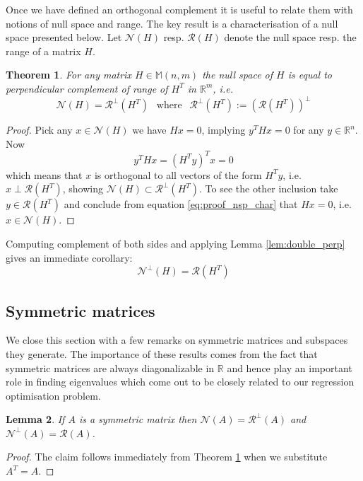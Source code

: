 \documentclass[a4paper,11pt]{article}
\theoremstyle{break}
\newtheorem{theorem}{Theorem}[section]
\newtheorem{lemma}[theorem]{Lemma}
\newcommand{\R}{\mathbb{R}}
\newcommand{\Nu}{\mathcal{N}}
\newcommand{\Ra}{\mathcal{R}}
\newcommand{\Mat}[2]{\mathbb{M}(#1, #2)}
\begin{document}
Once we have defined an orthogonal complement it is useful to relate them with notions of null space and range.
The key result is a characterisation of a null space presented below.
Let $\Nu(H)$ resp. $\Ra(H)$ denote the null space resp. the range of a matrix $H$.

\begin{theorem} \label{thm:charact_nullspace}
    For any matrix $H \in \Mat{n}{m}$ the null space of $H$ is equal to perpendicular complement of range of $H^T$ in $\R^m$, i.e.
    $$\Nu(H) = \Ra^\perp(H^T) ~~\text{ where }~~ \Ra^\perp(H^T) := (\Ra(H^T))^\perp$$
\end{theorem}

\begin{proof}
    Pick any $x \in \Nu(H)$ we have $H x = 0$, implying $ y^T H x = 0$ for any $y \in \R^n$. Now
    \begin{equation}\label{eq:proof_nsp_char}
        y^T H x = (H^T y )^T x = 0
    \end{equation}
    which means that $x$ is orthogonal to all vectors of the form $ H^T y $, i.e. $ x \perp \Ra(H^T)$, showing $ \Nu(H) \subset \Ra^\perp(H^T)$. To see the other inclusion take $ y \in \Ra(H^T) $ and conclude from equation \eqref{eq:proof_nsp_char} that $ H x = 0$, i.e. $ x \in \Nu(H)$.
\end{proof}
Computing complement of both sides and applying Lemma \ref{lem:double_perp} gives an immediate corollary:
    $$\Nu^\perp(H) = \Ra(H^T)$$

\subsection{Symmetric matrices}
We close this section with a few remarks on symmetric matrices and subspaces they generate. The importance of these results comes from the fact that symmetric matrices are always diagonalizable in $\R$ and hence play an important role in finding eigenvalues which come out to be closely related to our regression optimisation problem. 

\begin{lemma} \label{lem:charact_sym_nullspace}
    If $A$ is a symmetric matrix then $\Nu(A) = \Ra^\perp(A)$ and $\Nu^\perp(A) = \Ra(A)$.
\end{lemma}
\begin{proof}
    The claim follows immediately from Theorem \ref{thm:charact_nullspace} when we substitute $A^T = A$.
\end{proof}
\end{document}
